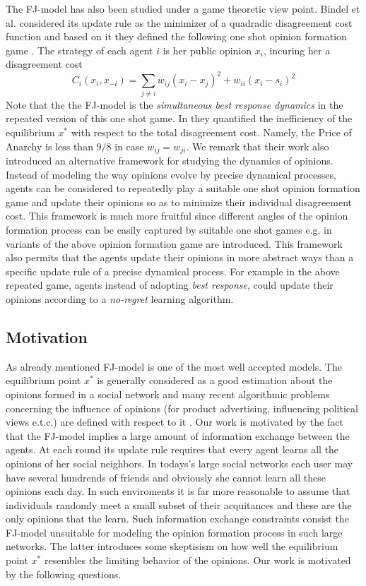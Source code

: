 The FJ-model has also been studied under a game theoretic
view point. Bindel et al. considered its update rule
as the minimizer of a quadradic disagreement cost function
and based on it they defined the following one shot
opinion formation game \cite{BKO11}. The strategy of each agent $i$ is
her public opinion $x_i$, incuring her a
disagreement cost
%
\begin{equation}\label{eq:BKO_cost}
  C_i(x_i,x_{-i})=
  \sum_{j \neq i}w_{ij} (x_i-x_j)^2 + w_{ii}(x_i-s_i)^2
\end{equation}
%
Note that the the FJ-model is the \emph{simultaneous best response dynamics} 
in the repeated version of this one shot game. In \cite{BKO11}
they quantified the inefficiency of the equilibrium $x^*$ with 
respect to the total disagreement cost. Namely, the Price of Anarchy 
is less than $9/8$ in case $w_{ij}=w_{ji}$.
We remark that their work also introduced an alternative
framework for studying the dynamics of opinions.
Instead of modeling the way opinions evolve
by precise dynamical processes, agents can be considered to repeatedly
play a suitable one shot opinion formation game and update their 
opinions so as to minimize their individual disagreement cost. 
This framework is much more fruitful since 
different angles of the opinion formation process can be easily 
captured by suitable one shot games e.g. in \cite{BGM13,EFHS17} 
variants of the above opinion formation game are introduced.
This framework also permits that the agents 
update their opinions in more abstract ways than
a specific update rule of a precise dynamical process.
For example in the above repeated game, agents instead of
adopting \emph{best response}, could update their opinions according
to a \emph{no-regret} learning algorithm.

\subsection{Motivation}

As already mentioned FJ-model is one of the most 
well accepted models. The equilibrium point $x^*$ is 
generally considered as a good estimation about the 
opinions formed in a social network and many recent 
algorithmic problems concerning the influence of opinions 
(for product advertising, influencing political views e.t.c.) 
are defined with respect to it \cite{GTT13,AKPT18}. 
Our work is motivated by the fact that the FJ-model
implies a large amount of information exchange
between the agents. At each round its update rule requires 
that every agent learns all the opinions of her social neighbors.
In todays's large social networks each user
may have several hundrends of friends and obviously
she cannot learn all these opinions each day.
In such enviroments it is far more reasonable to assume
that individuals randomly meet a small subset of their 
acquitances and these are the only opinions that the learn.
Such information exchange constraints consist the FJ-model
unsuitable for modeling the opinion formation process
in such large networks. The latter introduces some skeptisism 
on how well the equilibrium point $x^*$ resembles the 
limiting behavior of the opinions. 
Our work is motivated by the following 
questions.

